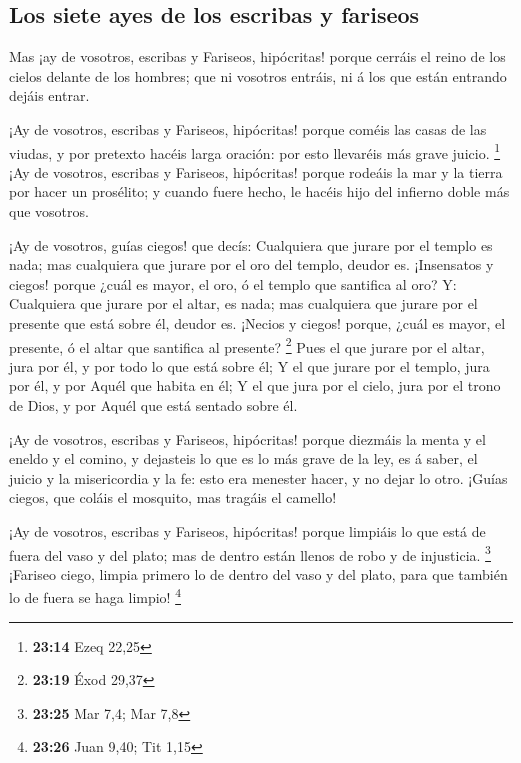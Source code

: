 \hypertarget{los-siete-ayes-de-los-escribas-y-fariseos}{%
\subsection{Los siete ayes de los escribas y
fariseos}\label{los-siete-ayes-de-los-escribas-y-fariseos}}

 Mas ¡ay de vosotros, escribas y Fariseos, hipócritas!
porque cerráis el reino de los cielos delante de los hombres; que ni
vosotros entráis, ni á los que están entrando dejáis entrar.

 ¡Ay de vosotros, escribas y Fariseos, hipócritas! porque
coméis las casas de las viudas, y por pretexto hacéis larga oración: por
esto llevaréis más grave juicio. \footnote{\textbf{23:14} Ezeq 22,25}
 ¡Ay de vosotros, escribas y Fariseos, hipócritas! porque
rodeáis la mar y la tierra por hacer un prosélito; y cuando fuere hecho,
le hacéis hijo del infierno doble más que vosotros.

 ¡Ay de vosotros, guías ciegos! que decís: Cualquiera que
jurare por el templo es nada; mas cualquiera que jurare por el oro del
templo, deudor es.  ¡Insensatos y ciegos! porque ¿cuál es
mayor, el oro, ó el templo que santifica al oro?  Y:
Cualquiera que jurare por el altar, es nada; mas cualquiera que jurare
por el presente que está sobre él, deudor es.  ¡Necios y
ciegos! porque, ¿cuál es mayor, el presente, ó el altar que santifica al
presente? \footnote{\textbf{23:19} Éxod 29,37}  Pues el que
jurare por el altar, jura por él, y por todo lo que está sobre él;
 Y el que jurare por el templo, jura por él, y por Aquél
que habita en él;  Y el que jura por el cielo, jura por el
trono de Dios, y por Aquél que está sentado sobre él.

 ¡Ay de vosotros, escribas y Fariseos, hipócritas! porque
diezmáis la menta y el eneldo y el comino, y dejasteis lo que es lo más
grave de la ley, es á saber, el juicio y la misericordia y la fe: esto
era menester hacer, y no dejar lo otro.  ¡Guías ciegos, que
coláis el mosquito, mas tragáis el camello!

 ¡Ay de vosotros, escribas y Fariseos, hipócritas! porque
limpiáis lo que está de fuera del vaso y del plato; mas de dentro están
llenos de robo y de injusticia. \footnote{\textbf{23:25} Mar 7,4; Mar
  7,8}  ¡Fariseo ciego, limpia primero lo de dentro del
vaso y del plato, para que también lo de fuera se haga limpio!
\footnote{\textbf{23:26} Juan 9,40; Tit 1,15}

